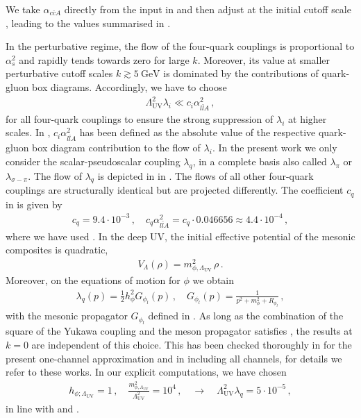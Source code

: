 \documentclass[aps,twocolumn,prd,superscriptaddress]{revtex4-2}
\begin{document}
We take $\alpha_{c\bar c A}$ directly from the input in \cite{Cyrol:2017ewj} and then adjust  at the initial cutoff scale , leading to the values summarised in .

In the perturbative regime, the flow of the four-quark couplings is proportional to $\alpha_s^2$ and rapidly tends towards zero for large $k$. Moreover, its value at smaller perturbative cutoff scales $k\gtrsim \qty{5}{\GeV}$ is dominated by the contributions of quark-gluon box diagrams. Accordingly, we have to choose 
%
\begin{align} 
 \Lambda_\textrm{UV}^2	\lambda_i \ll c_i \alpha_{l\bar l A}^2\,, 
	\label{eq:lambda=0}
\end{align} 
%
for all four-quark couplings to ensure the strong suppression of $\lambda_i$ at higher scales.
In , $c_i \alpha_{l\bar l A}^2$ has been defined as the absolute value of the respective quark-gluon box diagram contribution to the flow of $\lambda_i$.
In the present work we only consider the scalar-pseudoscalar coupling $\lambda_q$, in a complete basis also called $\lambda_\pi$ or $\lambda_{\sigma-\pi}$. 
The flow of $\lambda_q$ is depicted in  in . The flows of all other four-quark couplings are structurally identical but are projected differently.
The coefficient $c_q$ in  is given by 
%
\begin{align}
c_q = 9.4\cdot 10^{-3} \,, \quad c_q \alpha_{l\bar l A}^2 = c_q\cdot 0.046656 \approx 4.4\cdot 10^{-4}\,, 
\label{eq:boundlambdaq}
\end{align}
%
where we have used . In the deep UV, the initial effective potential of the mesonic composites is quadratic, 
%
\begin{align}\label{eq:UVPot}
	V_\Lambda(\rho) = m_{\phi, \Lambda_\textrm{UV}}^2\,\rho \,.
\end{align}
%
Moreover, on the equations of motion for $\phi$ we obtain
%
\begin{align}
\lambda_q(p) = \frac{1}{2} h_\phi^2 G_{\phi_l}(p) \,,\quad G_{\phi_l}(p) =\frac{1}{p^2 + m_\phi^2 + R_{\phi_l}}\,,
\end{align} 
%
with the mesonic propagator $G_{\phi_l}$ defined in . As long as the combination of the square of the Yukawa coupling and the meson propagator satisfies 	, the results at $k=0$ are independent of this choice. This has been checked thoroughly in \cite{Gies:2002hq, Braun:2008pi, Braun:2009gm, Braun:2014ata, Rennecke:2015eba, Fu:2019hdw} for the present one-channel approximation and in \cite{Mitter:2014wpa, Cyrol:2017ewj} including all channels, for details we refer to these works. In our explicit computations, we have chosen 
%
\begin{align} 
	h_{\phi;\Lambda_\textrm{UV}}=1 \,,\quad \frac{m_{\phi,\Lambda_\textrm{UV}}^2}{\Lambda_\textrm{UV}^2} = 10^4\,, \quad \to \quad \Lambda_\textrm{UV}^2	\lambda_q = 5\cdot 10^{-5}\,, 
\end{align}
%
in line with  and .
\end{document}
